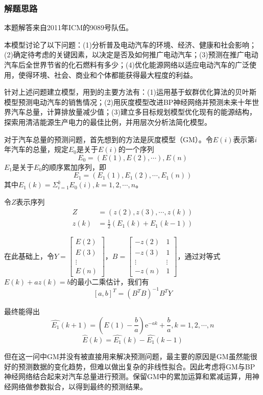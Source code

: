 \documentclass[bwprint]{cumcmthesis}
\begin{document}
\subsubsection{解题思路}

本题解答来自2011年ICM的9089号队伍。

本模型讨论了以下问题：(1)分析普及电动汽车的环境、经济、健康和社会影响；(2)确定待考虑的关键因素，以决定是否及如何推广电动汽车；(3)预测在推广电动汽车后全世界节省的化石燃料有多少；(4)优化能源网络以适应电动汽车的广泛使用，使得环境、社会、商业和个体都能获得最大程度的利益。

针对上述问题建立模型，用到的主要方法有：(1)运用基于蚁群优化算法的贝叶斯模型预测电动汽车的销售情况；(2)用灰度模型改进BP神经网络并预测未来十年世界汽车总量，计算排放量减少值；(3)建立多目标规划模型优化现有的能源结构，探索用清洁能源生产电力的最佳比例，并用层次分析法简化模型。

对于汽车总量的预测问题，首先想到的方法是灰度模型（GM）。令$E(i)$表示第$i$年汽车的总量，规定$E_0$是关于$E(i)$的一个序列
\[E_0 = (E(1),E(2),\cdots),E(n)\]
$E_1$是关于$E_0$的顺序累加序列，即
\[E_1 = (E_1(1),E_1(2),\cdots,E_1(n))\]
其中$E_1(k) = \Sigma_{i=1}^kE_0(i),k=1,2,\cdots,n$。

令$Z$表示序列
\[
\begin{split}
Z &= (z(2),z(3),\cdots,z(k))\\
z(k) &= \frac{1}{2} (E_1(k)+E_1(k-1))
\end{split}
\]

在此基础上，令$Y=\left[
\begin{matrix}
E(2)\\
E(3)\\
\vdots\\
E(n)
\end{matrix}\right]
$，$B=\left[
\begin{matrix}
-z(2) & 1\\
-z(3) & 1\\
\vdots & \vdots\\
-z(n) & 1
\end{matrix}\right]
$，通过对等式$E(k)+az(k)=b$的最小二乘估计，我们有
\[[a,b]^T = (B^T B)^{-1} B^T Y\]

最终能得出
\[\hat{E_1}(k+1) = (E(1)-\frac{b}{a})\mathrm{e} ^{-ak} + \frac{b}{a}, k=1,2,\cdots,n\]
\[\hat{E}(k) = \hat{E_1}(k) - \hat{E_1}(k-1)\]

但在这一问中GM并没有被直接用来解决预测问题，最主要的原因是GM虽然能很好的预测数据的变化趋势，但难以做出复杂的非线性拟合。因此考虑将GM与BP神经网络结合起来对汽车总量进行预测。保留GM中的累加运算和累减运算，用神经网络做参数拟合，以得到最终的预测结果。
\end{document}
